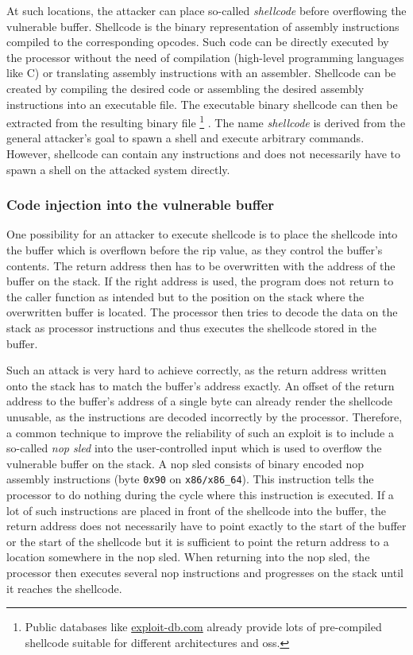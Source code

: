 At such locations, the attacker can place so-called \emph{shellcode} before overflowing the vulnerable buffer.
Shellcode is the binary representation of assembly instructions compiled to the corresponding \glspl{opcode}.
Such code can be directly executed by the processor without the need of compilation (high-level programming languages like C) or translating assembly instructions with an assembler.
Shellcode can be created by compiling the desired code or assembling the desired assembly instructions into an executable file.
The executable binary shellcode can then be extracted from the resulting binary file%
	\footnote{Public databases like \href{https://www.exploit-db.com/shellcodes}{exploit-db.com} already provide lots of pre-compiled shellcode suitable for different architectures and \glspl{os}.}%
.
The name \emph{shellcode} is derived from the general attacker's goal to spawn a shell and execute arbitrary commands.
However, shellcode can contain any instructions and does not necessarily have to spawn a shell on the attacked system directly.

\subsubsection{Code injection into the vulnerable buffer}
\label{subsubsec:ci-into-vuln-buffer}

One possibility for an attacker to execute shellcode is to place the shellcode into the buffer which is overflown before the \gls{rip} value, as they control the buffer's contents.
The return address then has to be overwritten with the address of the buffer on the stack.
If the right address is used, the program does not return to the caller function as intended but to the position on the stack where the overwritten buffer is located.
The processor then tries to decode the data on the stack as processor instructions and thus executes the shellcode stored in the buffer.

Such an attack is very hard to achieve correctly, as the return address written onto the stack has to match the buffer's address exactly.
An offset of the return address to the buffer's address of a single byte can already render the shellcode unusable, as the instructions are decoded incorrectly by the processor.
Therefore, a common technique to improve the reliability of such an exploit is to include a so-called \emph{\gls{nop} sled} into the user-controlled input which is used to overflow the vulnerable buffer on the stack.
A \gls{nop} sled consists of binary encoded \acs{nop} assembly instructions (byte \texttt{0x90} on \texttt{x86/x86\_64}).
This instruction tells the processor to do nothing during the cycle where this instruction is executed.
If a lot of such instructions are placed in front of the shellcode into the buffer, the return address does not necessarily have to point exactly to the start of the buffer or the start of the shellcode but it is sufficient to point the return address to a location somewhere in the \acs{nop} sled.
When returning into the \acs{nop} sled, the processor then executes several \gls{nop} instructions and progresses on the stack until it reaches the shellcode.

